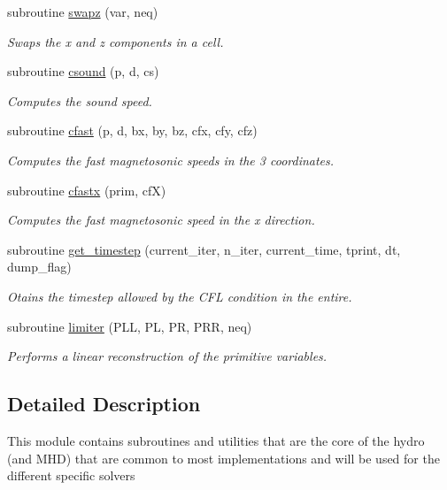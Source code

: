 \begin{DoxyCompactItemize}
subroutine \hyperlink{namespacehydro__core_ae4216bc7908e7665f0565aa8c885c821}{swapz} (var, neq)
\begin{DoxyCompactList}\small\item\em Swaps the x and z components in a cell. \end{DoxyCompactList}\item 
subroutine \hyperlink{namespacehydro__core_a27cb7ddb40cc0226e0139bd9eba42dfa}{csound} (p, d, cs)
\begin{DoxyCompactList}\small\item\em Computes the sound speed. \end{DoxyCompactList}\item 
subroutine \hyperlink{namespacehydro__core_ab2655b81626d4d95cb003112248e928a}{cfast} (p, d, bx, by, bz, cfx, cfy, cfz)
\begin{DoxyCompactList}\small\item\em Computes the fast magnetosonic speeds in the 3 coordinates. \end{DoxyCompactList}\item 
subroutine \hyperlink{namespacehydro__core_abd089f71325e32997703c1420db62aa8}{cfastx} (prim, cf\+X)
\begin{DoxyCompactList}\small\item\em Computes the fast magnetosonic speed in the x direction. \end{DoxyCompactList}\item 
subroutine \hyperlink{namespacehydro__core_a89c51c2e68906bd5c2a1487283e10181}{get\+\_\+timestep} (current\+\_\+iter, n\+\_\+iter, current\+\_\+time, tprint, dt, dump\+\_\+flag)
\begin{DoxyCompactList}\small\item\em Otains the timestep allowed by the C\+F\+L condition in the entire. \end{DoxyCompactList}\item 
subroutine \hyperlink{namespacehydro__core_ada63ca89d1a40cfd1a62db0ddfdbda80}{limiter} (P\+L\+L, P\+L, P\+R, P\+R\+R, neq)
\begin{DoxyCompactList}\small\item\em Performs a linear reconstruction of the primitive variables. \end{DoxyCompactList}\end{DoxyCompactItemize}


\subsection{Detailed Description}
This module contains subroutines and utilities that are the core of the hydro (and M\+H\+D) that are common to most implementations and will be used for the different specific solvers 

